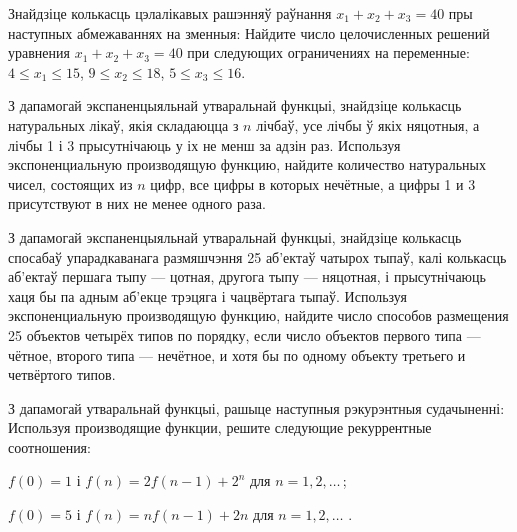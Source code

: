 \begin{problemList}
\bigskip

\problemItemWithCommonPart
{Знайдзіце колькасць цэлалікавых рашэнняў раўнання $x_1 + x_2 + x_3 = 40$ пры наступных
абмежаваннях на зменныя:}
{Найдите число целочисленных решений уравнения $x_1 + x_2 + x_3 = 40$ при
следующих ограничениях на переменные:}
{$4 \le x_1 \le 15$, $9 \le x_2 \le 18$, $5 \le x_3 \le 16$.}

\bigskip

\problemItemSimple
{З дапамогай экспаненцыяльнай утваральнай функцыі, знайдзіце колькасць натуральных лікаў,
якія складаюцца з $n$ лічбаў, усе лічбы ў якіх няцотныя, а лічбы 1 і 3 прысутнічаюць у іх
не менш за адзін раз.}
{Используя экспоненциальную производящую функцию, найдите количество
натуральных чисел, состоящих из $n$ цифр, все цифры в которых нечётные, а цифры 1 и 3
присутствуют в них не менее одного раза.}

\bigskip

\problemItemSimple
{З дапамогай экспаненцыяльнай утваральнай функцыі, знайдзіце колькасць спосабаў упарадкаванага размяшчэння
25 аб'ектаў чатырох тыпаў, калі колькасць аб'ектаў першага тыпу --- цотная, другога тыпу --- няцотная,
і прысутнічаюць хаця бы па адным аб'екце трэцяга і чацвёртага тыпаў.}
{Используя экспоненциальную производящую функцию, найдите число способов
размещения 25 объектов четырёх типов по порядку, если число объектов первого
типа --- чётное, второго типа --- нечётное, и хотя бы по одному объекту третьего и
четвёртого типов.}

\bigskip

\problemItemWithCommonPart
{З дапамогай утваральнай функцыі, рашыце наступныя рэкурэнтныя судачыненні:}
{Используя производящие функции, решите следующие рекуррентные соотношения:}
{\begin{belarusianEnumerate}
  \item $f(0) = 1$ і $f(n) = 2f(n - 1) + 2^n$ для $n = 1, 2, \ldots\, $;
  \item $f(0) = 5$ і $f(n) = nf(n - 1) + 2n$ для $n = 1, 2, \ldots\,\, $.
\end{belarusianEnumerate}}

\end{problemList}


